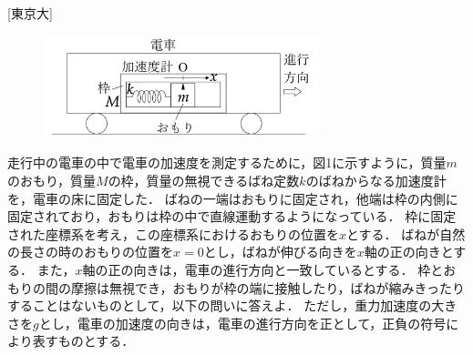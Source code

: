 

\noindent
{} [東京大]

\begin{figure}
    \includegraphics[width=8cm]{fig/fig_1_7_1.pdf}
    \caption{}
\end{figure}
走行中の電車の中で電車の加速度を測定するために，図1に示すように，質量$m$のおもり，質量$M$の枠，質量の無視できるばね定数$k$のばねからなる加速度計を，電車の床に固定した．
ばねの一端はおもりに固定され，他端は枠の内側に固定されており，おもりは枠の中で直線運動するようになっている．
枠に固定された座標系を考え，この座標系におけるおもりの位置を$x$とする．
ばねが自然の長さの時のおもりの位置を$x = 0$とし，ばねが伸びる向きを$x$軸の正の向きとする．
また，$x$軸の正の向きは，電車の進行方向と一致しているとする．
枠とおもりの間の摩擦は無視でき，おもりが枠の端に接触したり，ばねが縮みきったりすることはないものとして，以下の問いに答えよ．
ただし，重力加速度の大きさを$g$とし，電車の加速度の向きは，電車の進行方向を正として，正負の符号により表すものとする．

